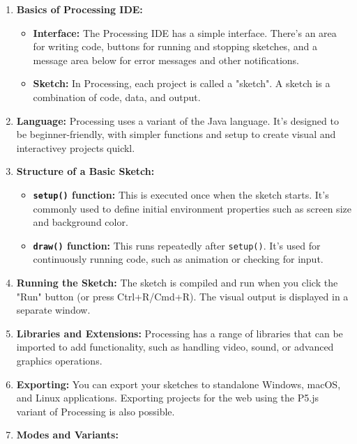 \documentclass[
]{article}
\author{}
\date{}
\begin{document}
\begin{enumerate}
\def\labelenumi{\arabic{enumi}.}
\item
  \textbf{Basics of Processing IDE:}

  \begin{itemize}
  \item
    \textbf{Interface:} The Processing IDE has a simple interface.
    There's an area for writing code, buttons for running and stopping
    sketches, and a message area below for error messages and other
    notifications.
  \item
    \textbf{Sketch:} In Processing, each project is called a "sketch". A
    sketch is a combination of code, data, and output.
  \end{itemize}
\item
  \textbf{Language:} Processing uses a variant of the Java language.
  It's designed to be beginner-friendly, with simpler functions and
  setup to create visual and interactivey projects quickl.
\item
  \textbf{Structure of a Basic Sketch:}

  \begin{itemize}
  \item
    \textbf{\texttt{setup()} function:} This is executed once when the
    sketch starts. It's commonly used to define initial environment
    properties such as screen size and background color.
  \item
    \textbf{\texttt{draw()} function:} This runs repeatedly after
    \texttt{setup()}. It's used for continuously running code, such as
    animation or checking for input.
  \end{itemize}
\item
  \textbf{Running the Sketch:} The sketch is compiled and run when you
  click the "Run" button (or press Ctrl+R/Cmd+R). The visual output is
  displayed in a separate window.
\item
  \textbf{Libraries and Extensions:} Processing has a range of libraries
  that can be imported to add functionality, such as handling video,
  sound, or advanced graphics operations.
\item
  \textbf{Exporting:} You can export your sketches to standalone
  Windows, macOS, and Linux applications. Exporting projects for the web
  using the P5.js variant of Processing is also possible.
\item
  \textbf{Modes and Variants:}


\end{enumerate}
\end{document}

